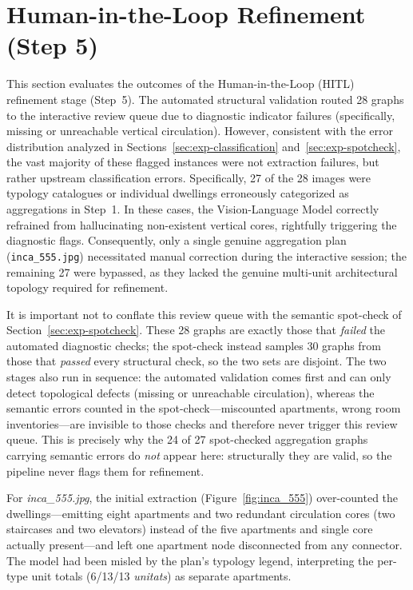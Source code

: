 \documentclass[12pt,a4paper,openright]{report}
\begin{document}
\section{Human-in-the-Loop Refinement (Step 5)}
\label{sec:exp-hitl}

This section evaluates the outcomes of the Human-in-the-Loop (HITL) refinement stage (Step~5). The automated structural validation routed 28 graphs to the interactive review queue due to diagnostic indicator failures (specifically, missing or unreachable vertical circulation). However, consistent with the error distribution analyzed in Sections~\ref{sec:exp-classification} and~\ref{sec:exp-spotcheck}, the vast majority of these flagged instances were not extraction failures, but rather upstream classification errors. Specifically, 27 of the 28 images were typology catalogues or individual dwellings erroneously categorized as aggregations in Step~1. In these cases, the Vision-Language Model correctly refrained from hallucinating non-existent vertical cores, rightfully triggering the diagnostic flags. Consequently, only a single genuine aggregation plan (\texttt{inca\_555.jpg}) necessitated manual correction during the interactive session; the remaining 27 were bypassed, as they lacked the genuine multi-unit architectural topology required for refinement.

It is important not to conflate this review queue with the semantic spot-check of Section~\ref{sec:exp-spotcheck}. These 28 graphs are exactly those that \emph{failed} the automated diagnostic checks; the spot-check instead samples 30 graphs from those that \emph{passed} every structural check, so the two sets are disjoint. The two stages also run in sequence: the automated validation comes first and can only detect topological defects (missing or unreachable circulation), whereas the semantic errors counted in the spot-check---miscounted apartments, wrong room inventories---are invisible to those checks and therefore never trigger this review queue. This is precisely why the 24 of 27 spot-checked aggregation graphs carrying semantic errors do \emph{not} appear here: structurally they are valid, so the pipeline never flags them for refinement.

For \textit{inca\_555.jpg}, the initial extraction (Figure~\ref{fig:inca_555}) over-counted the dwellings---emitting eight apartments and two redundant circulation cores (two staircases and two elevators) instead of the five apartments and single core actually present---and left one apartment node disconnected from any connector. The model had been misled by the plan's typology legend, interpreting the per-type unit totals (6/13/13 \emph{unitats})
as separate apartments.
\end{document}
